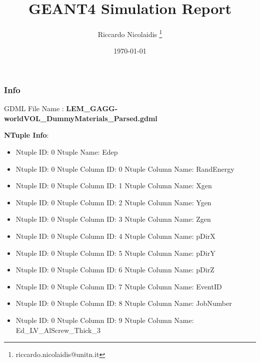 \documentclass[8pt]{beamer}
\title{GEANT4 Simulation Report}
\author{Riccardo Nicolaidis \footnote{riccardo.nicolaidis@unitn.it}}
\date{\today}
\begin{document}
        
            \begin{frame}
                \titlepage
            \end{frame}
            
            \begin{frame}
                \frametitle{Info}
            
                \centering
                GDML File Name : \textbf{ LEM\_GAGG-worldVOL\_DummyMaterials\_Parsed.gdml}
                
                
                \vspace{2 cm}
                \textbf{NTuple Info}:
                \vspace{1 cm}
                
        \begin{itemize}
        
        \item Ntuple ID: 0 Ntuple Name: Edep
        
        \item Ntuple ID: 0 Ntuple Column ID: 0 Ntuple Column Name: RandEnergy
        
        \item Ntuple ID: 0 Ntuple Column ID: 1 Ntuple Column Name: Xgen
        
        \item Ntuple ID: 0 Ntuple Column ID: 2 Ntuple Column Name: Ygen
        
        \item Ntuple ID: 0 Ntuple Column ID: 3 Ntuple Column Name: Zgen
        
        \item Ntuple ID: 0 Ntuple Column ID: 4 Ntuple Column Name: pDirX
        
        \item Ntuple ID: 0 Ntuple Column ID: 5 Ntuple Column Name: pDirY
        
        \item Ntuple ID: 0 Ntuple Column ID: 6 Ntuple Column Name: pDirZ
        
        \item Ntuple ID: 0 Ntuple Column ID: 7 Ntuple Column Name: EventID
        
        \item Ntuple ID: 0 Ntuple Column ID: 8 Ntuple Column Name: JobNumber
        
        \item Ntuple ID: 0 Ntuple Column ID: 9 Ntuple Column Name: Ed\_LV\_AlScrew\_Thick\_3
        

\end{itemize}
\end{frame}
\end{document}
